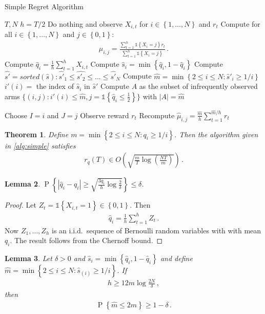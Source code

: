 \documentclass{article}
\newcommand{\set}[1]{\left\{#1\right\}}
\newcommand{\ind}[1]{\mathds{1}\!\!\set{#1}}
\newcommand{\eq}[1]{\begin{align*}#1\end{align*}}
\renewcommand{\P}[1]{\operatorname{P}\left\{#1\right\}}
\theoremstyle{plain}
\newtheorem{theorem}{Theorem}
\newtheorem{lemma}[theorem]{Lemma}
\theoremstyle{definition}
\begin{document}
\begin{algorithm}[H]
\caption{Simple Regret Algorithm}\label{alg:simple}
\begin{algorithmic}[1]
 $T, N$
\State $h = T/2$
\State Do nothing and observe $X_{i,t}$ for $i \in \set{1,\ldots,N}$ and $r_t$
\EndFor
\State Compute for all $i \in \set{1,\ldots,N}$ and $j \in \set{0,1}$:
\eq{
\hat \mu_{i,j} = \frac{\sum_{t=1}^h \ind{X_i = j} r_t}{\sum_{t=1}^h \ind{X_i = j}}\,.
}
\State Compute $\hat q_i = \frac{1}{h} \sum_{t=1}^h X_{i,t}$
\State Compute $\hat s_i = \min\set{\hat q_i, 1 - \hat q_i}$
\State Compute $\hat{s'} = sorted(\hat{s}) : \hat{s'}_1 \leq \hat{s'_2} \leq ... \leq \hat{s'}_N$
\State Compute $\hat m = \min\set{2 \leq i \leq N : \hat s'_{i} \geq 1/i}$
\State $i'(i) = $ the index of $\hat s_i$ in $\hat s'$
\State Compute $A$ as the subset of infrequently observed arms $\{(i,j):i'(i) \leq \hat m, j = \ind{\hat q_{i} \leq \frac{1}{2}} \}$ with $|A| = \hat m$

\State Choose $I = i$ and $J = j$
\State Observe reward $r_t$
\EndFor
\State Recompute $\hat \mu_{i,j} = \frac{\hat m}{h} \sum_{t=1}^{\hat m/h} r_t$ 
\EndFor
\end{algorithmic}
\end{algorithm}

\begin{theorem}\label{thm:simple-regret}
Define $m = \min\set{2 \leq i \leq N : q_i \geq 1/i}$.
Then the algorithm given in \cref{alg:simple} satisfies
\eq{
r_q(T) \in O\left(\sqrt{\frac{m}{T} \log \left(\frac{NT}{m}\right)}\right)\,.
}
\end{theorem}

\begin{lemma}\label{lem:conc1}
$\displaystyle \P{\left|\hat q_i - q_i\right| \geq \sqrt{\frac{3q_i}{h} \log \frac{2}{\delta}}} \leq \delta$.
\end{lemma}

\begin{proof}
Let $Z_t = \ind{X_{i,t} = 1} \in \set{0,1}$.
Then
\eq{
\hat q_i = \frac{1}{h} \sum_{t=1}^{h} Z_t\,.
}
Now $Z_1,\ldots,Z_h$ is an i.i.d.\ sequence of Bernoulli random variables with with mean $q_i$. The result follows from the Chernoff bound.
\end{proof}

\begin{lemma}\label{lem:conc2}
Let $\delta >0$ and $\hat s_i = \min\set{\hat q_i, 1 - \hat q_i}$ and
define $\hat m = \min\set{2 \leq i \leq N : \hat s_{(i)} \geq 1/i}$.
If
\eq{
h \geq 12m \log\frac{2N}{\delta}\,,
}
then
\eq{
\P{\hat m \leq 2m} \geq 1 - \delta\,.
}
\end{lemma}
\end{document}
